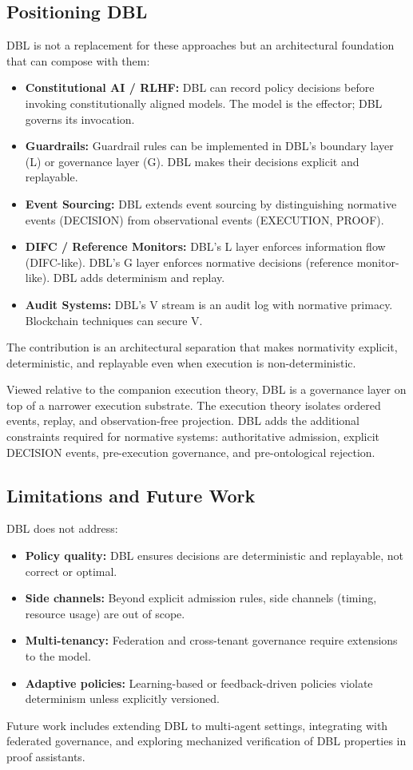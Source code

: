 \subsection{Positioning DBL}

DBL is not a replacement for these approaches but an architectural foundation that can compose with them:

\begin{itemize}
  \item \textbf{Constitutional AI / RLHF:} DBL can record policy decisions before invoking constitutionally aligned models. The model is the effector; DBL governs its invocation.
  
  \item \textbf{Guardrails:} Guardrail rules can be implemented in DBL's boundary layer (L) or governance layer (G). DBL makes their decisions explicit and replayable.
  
  \item \textbf{Event Sourcing:} DBL extends event sourcing by distinguishing normative events (DECISION) from observational events (EXECUTION, PROOF).
  
  \item \textbf{DIFC / Reference Monitors:} DBL's L layer enforces information flow (DIFC-like). DBL's G layer enforces normative decisions (reference monitor-like). DBL adds determinism and replay.
  
  \item \textbf{Audit Systems:} DBL's V stream is an audit log with normative primacy. Blockchain techniques can secure V.
\end{itemize}

The contribution is an architectural separation that makes normativity explicit, deterministic, and replayable even when execution is non-deterministic.

Viewed relative to the companion execution theory, DBL is a governance layer on top of a narrower execution substrate. The execution theory isolates ordered events, replay, and observation-free projection. DBL adds the additional constraints required for normative systems: authoritative admission, explicit DECISION events, pre-execution governance, and pre-ontological rejection.

\subsection{Limitations and Future Work}

DBL does not address:
\begin{itemize}
  \item \textbf{Policy quality:} DBL ensures decisions are deterministic and replayable, not correct or optimal.
  \item \textbf{Side channels:} Beyond explicit admission rules, side channels (timing, resource usage) are out of scope.
  \item \textbf{Multi-tenancy:} Federation and cross-tenant governance require extensions to the model.
  \item \textbf{Adaptive policies:} Learning-based or feedback-driven policies violate determinism unless explicitly versioned.
\end{itemize}

Future work includes extending DBL to multi-agent settings, integrating with federated governance, and exploring mechanized verification of DBL properties in proof assistants.
